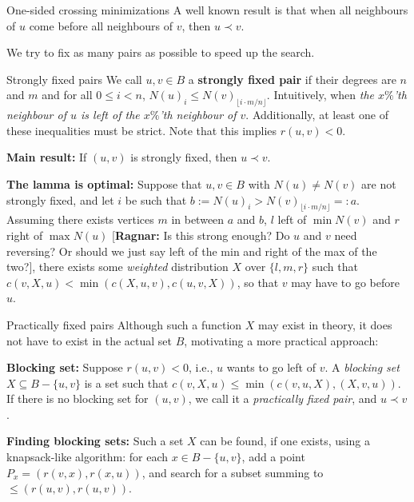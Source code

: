 \documentclass[final]{beamer}
\newlength{\colwidth}
\theoremstyle{remark}
\renewcommand{\b}{\prec}
\newcommand{\ragnar}[1]{{\color{orange}[{\bf{Ragnar:}} #1]}}
\begin{document}
\begin{frame}[t]
\begin{columns}[t]
\begin{column}{\colwidth}
\begin{block}{One-sided crossing minimizations}
        A well known result is that when all neighbours of $u$ come before all
        neighbours of $v$, then $u\b v$.

        We try to fix as many pairs as possible to speed up the search.
      \end{block}

      \begin{block}{Strongly fixed pairs}
        We call $u, v \in B$ a \textbf{strongly fixed pair} if their degrees are $n$
        and $m$ and for all $0 \leq i < n$, $N(u)_i \leq N(v)_{\lfloor i\cdot m/n
          \rfloor}$.
        Intuitively, when \emph{the $x\%$'th neighbour of $u$ is left of the $x\%$'th
        neighbour of $v$}. Additionally, at least one of these inequalities must be strict.
        Note that this implies $r(u, v) < 0$.

        \textbf{Main result:}
        If $(u, v)$ is strongly fixed, then $u \b v$.

        \textbf{The lamma is optimal:}
        Suppose that $u, v \in B$ with $N(u) \neq N(v)$ are not strongly fixed, and let $i$ be
        such that $b:=N(u)_i > N(v)_{\lfloor i\cdot m/n\rfloor}=:a$.
        Assuming there exists vertices $m$ in between $a$ and $b$, $l$ left of $\min
        N(v)$ and $r$ right of $\max N(u)$ \ragnar{Is this strong enough? Do $u$ and $v$
          need reversing? Or should we just say left of the min and right of the max
          of the two?}, there exists some \emph{weighted} distribution $X$ over
        $\{l, m, r\}$ such that $c(v, X, u) < \min(c(X, u, v), c(u, v, X))$, so that
        $v$ may have to go before $u$.
      \end{block}

      \begin{block}{Practically fixed pairs}
        Although such a function $X$ may exist in theory, it does
        not have to exist in the actual set $B$, motivating a more practical approach:

        \textbf{Blocking set:}
        Suppose $r(u,v)< 0$, i.e., $u$ wants to go left of $v$.
        A \emph{blocking set} $X\subseteq B-\{u,v\}$ is a set such that $c(v,X,u) \leq \min(c(v, u,
        X), (X, v, u))$.  If there is no blocking set for $(u, v)$, we call it a
        \emph{practically fixed pair}, and $u\b v$.
      \end{block}

      \textbf{Finding blocking sets:}
      Such a set $X$ can be found, if one exists, using a knapsack-like algorithm: for
      each $x\in B-\{u,v\}$, add a point $P_x = (r(v, x), r(x, u))$, and search for a subset summing
      to ${\leq{}(r(u, v), r(u, v))}$.


\end{column}
\end{columns}
\end{frame}
\end{document}
